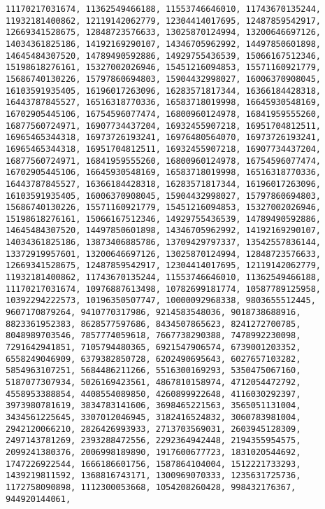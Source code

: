 \documentclass[12pt]{article}
\begin{document}
\begin{verbatim}
11170217031674, 11362549466188, 11553746646010, 11743670135244,
11932181400862, 12119142062779, 12304414017695, 12487859542917,
12669341528675, 12848723576633, 13025870124994, 13200646697126,
14034361825186, 14192169290107, 14346705962992, 14497850601898,
14645484307520, 14789490592886, 14929755436539, 15066167512346,
15198618276161, 15327002026946, 15451216094853, 15571160921779, 
15686740130226, 15797860694803, 15904432998027, 16006370908045, 
16103591935405, 16196017263096, 16283571817344, 16366184428318, 
16443787845527, 16516318770336, 16583718019998, 16645930548169, 
16702905445106, 16754596077474, 16800960124978, 16841959555260, 
16877560724971, 16907734437204, 16932455907218, 16951704812511, 
16965465344318, 16973726193241, 16976480564070, 16973726193241, 
16965465344318, 16951704812511, 16932455907218, 16907734437204, 
16877560724971, 16841959555260, 16800960124978, 16754596077474, 
16702905445106, 16645930548169, 16583718019998, 16516318770336, 
16443787845527, 16366184428318, 16283571817344, 16196017263096, 
16103591935405, 16006370908045, 15904432998027, 15797860694803, 
15686740130226, 15571160921779, 15451216094853, 15327002026946, 
15198618276161, 15066167512346, 14929755436539, 14789490592886, 
14645484307520, 14497850601898, 14346705962992, 14192169290107, 
14034361825186, 13873406885786, 13709429797337, 13542557836144, 
13372919957601, 13200646697126, 13025870124994, 12848723576633, 
12669341528675, 12487859542917, 12304414017695, 12119142062779, 
11932181400862, 11743670135244, 11553746646010, 11362549466188, 
11170217031674, 10976887613498, 10782699181774, 10587789125958, 
10392294222573, 10196350507747, 10000092968338, 9803655512445, 
9607170879264, 9410770317986, 9214583548036, 9018738688916, 
8823361952383, 8628577597686, 8434507865623, 8241272700785, 
8048989703546, 7857774059618, 7667738290388, 7478992230098, 
7291642941851, 7105794480365, 6921547906574, 6739001203352, 
6558249046909, 6379382850728, 6202490695643, 6027657103282,
5854963107251, 5684486211266, 5516300169293, 5350475067160, 
5187077307934, 5026169423561, 4867810158974, 4712054472792, 
4558953388854, 4408554089850, 4260899922648, 4116030292397, 
3973980781619, 3834783141606, 3698465221563, 3565051131004, 
3434561225645, 3307012046945, 3182416524832, 3060783981004, 
2942120066210, 2826426993933, 2713703569031, 2603945128309, 
2497143781269, 2393288472556, 2292364942448, 2194355954575, 
2099241380376, 2006998189890, 1917600677723, 1831020544692, 
1747226922544, 1666186601756, 1587864104004, 1512221733293, 
1439219811592, 1368816743171, 1300969070333, 1235631725736, 
1172758090898, 1112300053668, 1054208260428, 998432176367, 944920144061, 

\end{verbatim}
\end{document}
